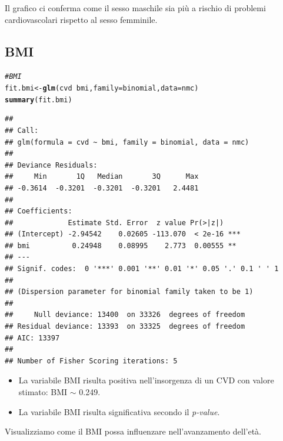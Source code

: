 \documentclass{article}\usepackage[]{graphicx}\usepackage[]{xcolor}
\makeatletter
\newcommand{\hlcom}[1]{\textcolor[rgb]{0.678,0.584,0.686}{\textit{#1}}}%
\newcommand{\hlopt}[1]{\textcolor[rgb]{0,0,0}{#1}}%
\newcommand{\hlstd}[1]{\textcolor[rgb]{0.345,0.345,0.345}{#1}}%
\newcommand{\hlkwb}[1]{\textcolor[rgb]{0.69,0.353,0.396}{#1}}%
\newcommand{\hlkwc}[1]{\textcolor[rgb]{0.333,0.667,0.333}{#1}}%
\newcommand{\hlkwd}[1]{\textcolor[rgb]{0.737,0.353,0.396}{\textbf{#1}}}%
\newenvironment{kframe}{%
 \def\at@end@of@kframe{}%
 \ifinner\ifhmode%
  \def\at@end@of@kframe{\end{minipage}}%
  \begin{minipage}{\columnwidth}%
 \fi\fi%
 \def\FrameCommand##1{\hskip\@totalleftmargin \hskip-\fboxsep
 \colorbox{shadecolor}{##1}\hskip-\fboxsep
     \hskip-\linewidth \hskip-\@totalleftmargin \hskip\columnwidth}%
 \MakeFramed {\advance\hsize-\width
   \@totalleftmargin\z@ \linewidth\hsize
   \@setminipage}}%
 {\par\unskip\endMakeFramed%
 \at@end@of@kframe}
\newenvironment{knitrout}{}{} %
\makeatother
\begin{document}
    Il grafico ci conferma come il sesso maschile sia più a rischio di problemi
    cardiovascolari rispetto al sesso femminile.
  
  \subsection{BMI}
\begin{knitrout}
\color{fgcolor}\begin{kframe}
\begin{alltt}
\hlcom{#BMI}
\hlstd{fit.bmi} \hlkwb{<-} \hlkwd{glm}\hlstd{(cvd}\hlopt{~}\hlstd{bmi,} \hlkwc{family}\hlstd{=binomial,} \hlkwc{data}\hlstd{=nmc)}
\hlkwd{summary}\hlstd{(fit.bmi)}
\end{alltt}
\begin{verbatim}
## 
## Call:
## glm(formula = cvd ~ bmi, family = binomial, data = nmc)
## 
## Deviance Residuals: 
##     Min       1Q   Median       3Q      Max  
## -0.3614  -0.3201  -0.3201  -0.3201   2.4481  
## 
## Coefficients:
##             Estimate Std. Error  z value Pr(>|z|)    
## (Intercept) -2.94542    0.02605 -113.070  < 2e-16 ***
## bmi          0.24948    0.08995    2.773  0.00555 ** 
## ---
## Signif. codes:  0 '***' 0.001 '**' 0.01 '*' 0.05 '.' 0.1 ' ' 1
## 
## (Dispersion parameter for binomial family taken to be 1)
## 
##     Null deviance: 13400  on 33326  degrees of freedom
## Residual deviance: 13393  on 33325  degrees of freedom
## AIC: 13397
## 
## Number of Fisher Scoring iterations: 5
\end{verbatim}
\end{kframe}
\end{knitrout}
    
    \begin{itemize}
      \item La variabile BMI risulta positiva nell'insorgenza di un CVD con 
            valore stimato: BMI $\sim$ 0.249.
      \item La variabile BMI risulta significativa secondo il \emph{p-value}.
    \end{itemize}
    
    Visualizziamo come il BMI possa influenzare nell'avanzamento dell'età.
    
\end{document}
